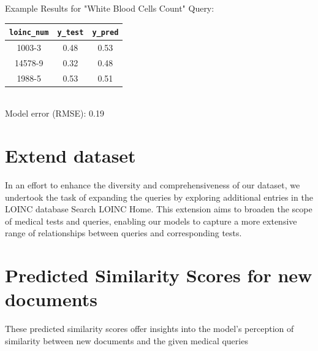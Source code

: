 \documentclass[12pt]{article}
\begin{document}
Example Results for "White Blood Cells Count" Query:

\begin{table}[H]
	\centering
    \begin{tabular}{ccc}
        \toprule
        \texttt{loinc\_num} & \texttt{y\_test} & \texttt{y\_pred} \\
        \midrule
        1003-3 & 0.48 & 0.53 \\
        14578-9 & 0.32 & 0.48 \\
        1988-5 & 0.53 & 0.51 \\
        \bottomrule
    \end{tabular} \\
    Model error (RMSE): 0.19
\end{table}

\section{Extend dataset}

In an effort to enhance the diversity and comprehensiveness of our dataset, we undertook the task of expanding the queries by exploring additional entries in the LOINC database Search LOINC Home\cite{noauthor_searchloinc_nodate}. This extension aims to broaden the scope of medical tests and queries, enabling our models to capture a more extensive range of relationships between queries and corresponding tests.

\section{Predicted Similarity Scores for new documents}

These predicted similarity scores offer insights into the model's perception of similarity between new documents and the given medical queries

\begin{table}[H]
    \centering
\end{table}

\clearpage

\printbibliography
\end{document}
